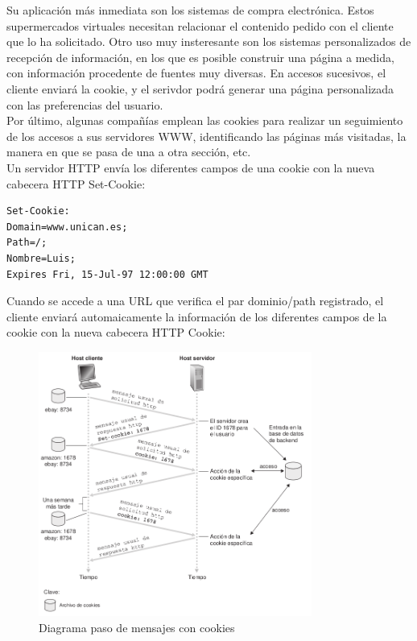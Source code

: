 \documentclass[a4paper,11pt]{article}
\begin{document}
Su aplicación más inmediata son los sistemas de compra electrónica. Estos supermercados virtuales necesitan relacionar el contenido pedido con el cliente que lo ha solicitado. Otro uso muy insteresante son los sistemas personalizados de recepción de información, en los que es posible construir una página a medida, con información procedente de fuentes muy diversas. En accesos sucesivos, el cliente enviará la cookie, y el serivdor podrá generar una página personalizada con las preferencias del usuario. \\

Por último, algunas compañías emplean las cookies para realizar un seguimiento de los accesos a sus servidores WWW, identificando las páginas más visitadas, la manera en que se pasa de una a otra sección, etc. \\

Un servidor HTTP envía los diferentes campos de una cookie con la nueva cabecera HTTP Set-Cookie:

\begin{verbatim}
Set-Cookie: 
Domain=www.unican.es;
Path=/;
Nombre=Luis;
Expires Fri, 15-Jul-97 12:00:00 GMT
\end{verbatim}

Cuando se accede a una URL que verifica el par dominio/path registrado, el cliente enviará automaicamente la información de los diferentes campos de la cookie con la nueva cabecera HTTP Cookie:

\begin{figure}[h]
\centering
\caption{Diagrama paso de mensajes con cookies}
\includegraphics[scale=1,width=0.8\textwidth]{paso_mensajes_cookie.png}
\end{figure}
\end{document}
